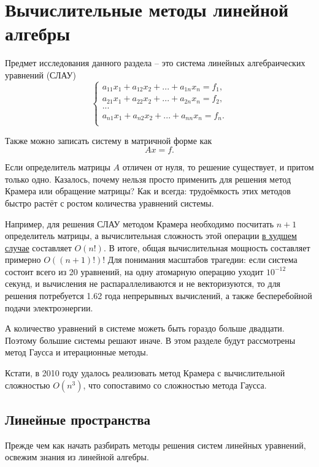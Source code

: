 \documentclass{article}
\begin{document}
\section{Вычислительные методы линейной алгебры}
Предмет исследования данного раздела -- это система линейных алгебраических
уравнений (СЛАУ)
\[
	\begin{cases}
		a_{11}x_1+a_{12}x_2+...+a_{1n}x_n=f_1, \\
		a_{21}x_1+a_{22}x_2+...+a_{2n}x_n=f_2, \\
		... \\
		a_{n1}x_1+a_{n2}x_2+...+a_{nn}x_n=f_n. \\
	\end{cases}
\]

Также можно записать систему в матричной форме как
\[Ax=f.\]

Если определитель матрицы $A$ отличен от нуля, то решение существует, и притом
только одно. Казалось, почему нельзя просто применить для решения метод Крамера
или обращение матрицы? Как и всегда: трудоёмкость этих методов быстро растёт с
ростом количества уравнений системы.

Например, для решения СЛАУ методом Крамера необходимо посчитать $n+1$
определитель матрицы, а вычислительная сложность этой операции \underline{в
худшем случае} составляет $O(n!)$. В итоге, общая вычислительная мощность
составляет примерно $O((n+1)!)$! Для понимания масштабов трагедии: если система
состоит всего из 20 уравнений, на одну атомарную операцию уходит $10^{-12}$
секунд, и вычисления не распараллеливаются и не векторизуются, то для решения
потребуется 1.62 года непрерывных вычислений, а также бесперебойной подачи
электроэнергии.

А количество уравнений в системе можеть быть гораздо больше двадцати. Поэтому
большие системы решают иначе. В этом разделе будут рассмотрены метод Гаусса и
итерационные методы.

Кстати, в 2010 году удалось реализовать метод Крамера с вычислительной
сложностью $O(n^3)$, что сопоставимо со сложностью метода Гаусса.

\newpage

\subsection{Линейные пространства}
Прежде чем как начать разбирать методы решения систем линейных уравнений,
освежим знания из линейной алгебры.
\end{document}
